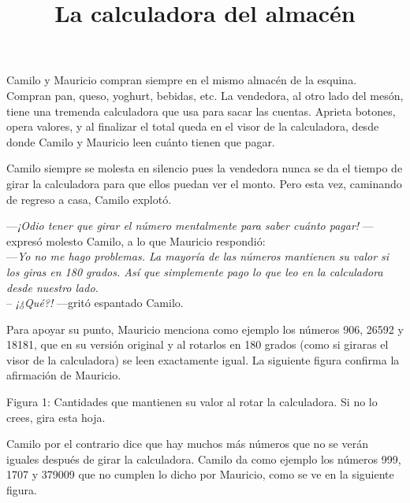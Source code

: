 \documentclass{oci}
\title{La calculadora del almacén}
\begin{document}
\begin{problemDescription}

Camilo y Mauricio compran siempre en el mismo almacén de la esquina. %
Compran pan, queso, yoghurt, bebidas, etc. 
La vendedora, al otro lado del mesón, tiene una tremenda calculadora que usa para sacar las cuentas. 
Aprieta botones, opera valores, y al finalizar el total queda en el visor de la calculadora, 
desde donde Camilo y Mauricio leen cuánto tienen que pagar.

Camilo siempre se molesta en silencio pues la vendedora nunca se da el tiempo de girar la calculadora para que ellos puedan ver el monto.
Pero esta vez, caminando de regreso a casa, Camilo explotó.

---\emph{¡Odio tener que girar el número mentalmente para saber cuánto pagar!} ---expresó molesto Camilo, a lo que Mauricio respondió: \\
---\emph{Yo no me hago problemas. La mayoría de las números mantienen su valor si los giras en 180 grados. Así que simplemente pago lo que leo en la calculadora desde nuestro lado.} \\
-- \emph{¡¿Qué?!} ---gritó espantado Camilo.

Para apoyar su punto, Mauricio menciona como ejemplo los números 906, 26592 y
18181, que en su versión original y al rotarlos en 180 grados (como si giraras
el visor de la calculadora) se leen exactamente igual. La siguiente figura
confirma la afirmación de Mauricio.

\bigskip
\bigskip

\begin{center}
\resizebox{!}{40pt}{} \hspace*{50pt}  
\resizebox{!}{40pt}{} \hspace*{50pt}  
\resizebox{!}{40pt}{}\bigskip

{Figura 1: Cantidades que mantienen su valor al rotar la calculadora. Si no lo crees, gira esta hoja.}
\end{center}

\bigskip
\bigskip


Camilo por el contrario dice que hay muchos más números que no se verán iguales después de girar la calculadora.
Camilo da como ejemplo los números 999, 1707 y 379009 que no cumplen lo dicho por Mauricio, como se ve en la siguiente figura.


\end{problemDescription}
\end{document}
